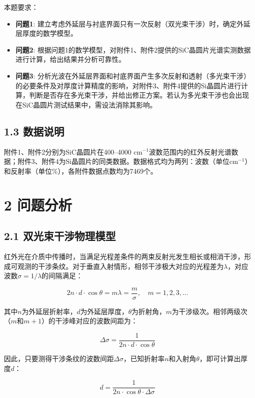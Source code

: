 \documentclass[12pt,a4paper]{article}
\begin{document}
本题要求：
\begin{itemize}
\item \textbf{问题1}: 建立考虑外延层与衬底界面只有一次反射（双光束干涉）时，确定外延层厚度的数学模型。
\item \textbf{问题2}: 根据问题1的数学模型，对附件1、附件2提供的SiC晶圆片光谱实测数据进行计算，给出结果并分析可靠性。
\item \textbf{问题3}: 分析光波在外延层界面和衬底界面产生多次反射和透射（多光束干涉）的必要条件及对厚度计算精度的影响，对附件3、附件4提供的Si晶圆片进行计算，判断是否存在多光束干涉，并给出修正方案。若认为多光束干涉也会出现在SiC晶圆片测试结果中，需设法消除其影响。
\end{itemize}

\subsection{1.3 数据说明}
附件1、附件2分别为SiC晶圆片在400--4000 cm$^{-1}$波数范围内的红外反射光谱数据；附件3、附件4为Si晶圆片的同类数据。数据格式均为两列：波数（单位cm$^{-1}$）和反射率（单位\%），各附件数据点数均为7469个。

\section{2 问题分析}

\subsection{2.1 双光束干涉物理模型}
红外光在介质中传播时，当满足光程差条件的两束反射光发生相长或相消干涉，形成可观测的干涉条纹。对于垂直入射情形，相邻干涉极大对应的光程差为$\lambda$，对应波数$\sigma=1/\lambda$的间隔满足：

\begin{equation}
2n \cdot d \cdot \cos\theta = m\lambda = \frac{m}{\sigma}, \quad m=1,2,3,\dots
\end{equation}

其中$n$为外延层折射率，$d$为外延层厚度，$\theta$为折射角，$m$为干涉级次。相邻两级次（$m$和$m+1$）的干涉峰对应的波数间距为：

\begin{equation}
\Delta\sigma = \frac{1}{2n\cdot d\cdot\cos\theta}
\end{equation}

因此，只要测得干涉条纹的波数间距$\Delta\sigma$，已知折射率$n$和入射角$\theta$，即可计算出厚度$d$：

\begin{equation}
d = \frac{1}{2n\cdot\cos\theta\cdot\Delta\sigma}
\end{equation}
\end{document}
